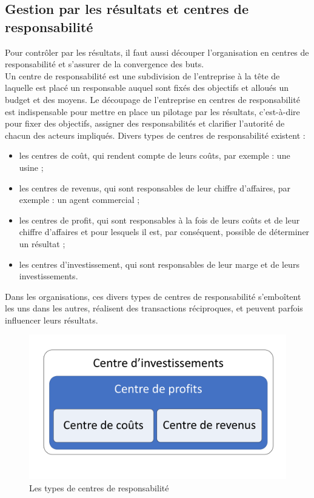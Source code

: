 \documentclass{tufte-handout}
\begin{document}
\subsection{Gestion par les résultats et centres de responsabilité}
\label{sec:org5910822}
Pour contrôler par les résultats, il faut aussi découper l’organisation en centres de responsabilité et s’assurer de la convergence des buts.\\
Un centre de responsabilité est une subdivision de l’entreprise à la tête de laquelle est placé un responsable auquel sont fixés des objectifs et alloués un budget et des moyens. Le découpage de l’entreprise en centres de responsabilité est indispensable pour mettre en place un pilotage par les résultats, c’est-à-dire pour fixer des objectifs, assigner des responsabilités et clarifier l’autorité de chacun des acteurs impliqués. Divers types de centres de responsabilité existent :\\
\begin{itemize}
\item les centres de coût, qui rendent compte de leurs coûts, par exemple : une usine ;\\
\item les centres de revenus, qui sont responsables de leur chiffre d’affaires, par exemple : un agent commercial ;\\
\item les centres de profit, qui sont responsables à la fois de leurs coûts et de leur chiffre d’affaires et pour lesquels il est, par conséquent, possible de déterminer un résultat ;\\
\item les centres d’investissement, qui sont responsables de leur marge et de leurs investissements.\\
\end{itemize}
Dans les organisations, ces divers types de centres de responsabilité s’emboîtent les uns dans les autres, réalisent des transactions réciproques, et peuvent parfois influencer leurs résultats.\\
\begin{figure}[htbp]
\centering
\includegraphics[width=.9\linewidth]{./img/centres.pdf}
\caption{Les types de centres de responsabilité}
\end{figure}
\end{document}
